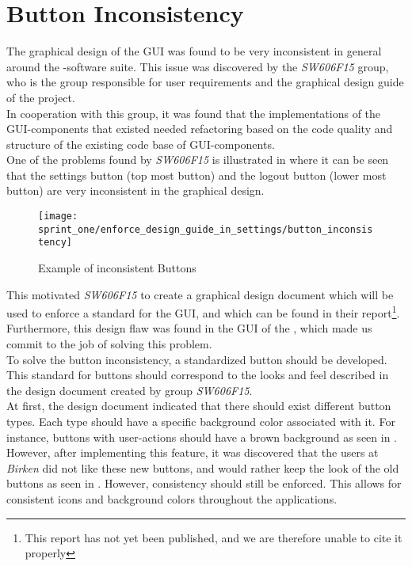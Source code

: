 \section{Button Inconsistency}
\label{sub:button_inconsistency}

The graphical design of the GUI was found to be very inconsistent in general around the \giraf-software suite. This issue was discovered by the \emph{SW606F15} group, who is the group responsible for user requirements and the graphical design guide of the project. \\

In cooperation with this group, it was found that the implementations of the GUI-components that existed needed refactoring based on the code quality and structure of the existing code base of GUI-components. \\

One of the problems found by \emph{SW606F15} is illustrated in  where it can be seen that the settings button (top most button) and the logout button (lower most button) are very inconsistent in the graphical design. \\

\begin{figure}[!htbp]
    \centering
    \texttt{[image: sprint\_one/enforce\_design\_guide\_in\_settings/button\_inconsistency]}
    \caption{Example of inconsistent Buttons}
    \label{fig:button_inconsistency}
\end{figure}

This motivated \emph{SW606F15} to create a graphical design document which will be used to enforce a standard for the GUI, and which can be found in their report\footnote{This report has not yet been published, and we are therefore unable to cite it properly}. Furthermore, this design flaw was found in the GUI of the \launcher, which made us commit to the job of solving this problem. \\

To solve the button inconsistency, a standardized button should be developed. This standard for buttons should correspond to the looks and feel described in the design document created by group \emph{SW606F15}. \\

At first, the design document indicated that there should exist different button types. Each type should have a specific background color associated with it. For instance, buttons with user-actions should have a brown background as seen in . However, after implementing this feature, it was discovered that the users at \emph{Birken} did not like these new buttons, and would rather keep the look of the old buttons as seen in . However, consistency should still be enforced. This allows for consistent icons and background colors throughout the applications.\\

